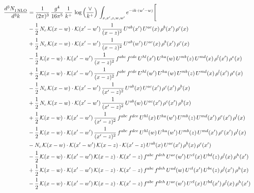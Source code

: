 \documentclass[9pt]{article}
\numberwithin{equation}{section}
\begin{document}
\begin{align}
\frac{d^{3}N_{1\,\rm NLO}^{\rm}}{d^{3}k}  & = \frac{1}{(2\pi)^{3}}\,\frac{g^{4}}{16\pi^{5}}\,\frac{1}{k^{+}}\,\log{\left(\frac{\vee}{k^{+}}\right)}\, \int_{x,x',z,w,w'}e^{-ik\cdot(w'-w)}\Bigg[\notag\\ &
-\frac{1}{2}\,N_{c}\,\mathcal{K}(x-w)\cdot\mathcal{K}(x'-w')\,\frac{1}{(x-z)^{2}}\,U^{ab}(x')\,U^{ac}(x)\,\rho^{b}(x')\,\rho^{c}(x)\notag\\
&+\frac{1}{2}\,N_{c}\,\mathcal{K}(x-w)\cdot\mathcal{K}(x'-w')\,\frac{1}{(x-z)^{2}}\,U^{ab}(w')\,U^{ac}(x)\,\rho^{b}(x')\,\rho^{c}(x)\notag\\
&-\frac{1}{2}\,\mathcal{K}(x-w)\cdot\mathcal{K}(x'-w')\,\frac{1}{(x-z)^{2}}\,f^{abc}\,f^{cde}\,U^{hl}(x')\,U^{ha}(w)\,U^{mb}(z)\,U^{md}(x)\,\rho^{l}(x')\,\rho^{e}(x)\notag\\
&+\frac{1}{2}\,\mathcal{K}(x-w)\cdot\mathcal{K}(x'-w')\,\frac{1}{(x-z)^{2}}\,f^{abc}\,f^{cde}\,U^{hl}(w')\,U^{ha}(w)\,U^{mb}(z)\,U^{md}(x)\,\rho^{l}(x')\,\rho^{e}(x)\notag\\
&-\frac{1}{2}\,N_{c}\,\mathcal{K}(x-w)\cdot\mathcal{K}(x'-w')\,\frac{1}{(x'-z)^{2}}\,U^{ab}(x)\,U^{ac}(x')\,\rho^{c}(x')\,\rho^{b}(x)\notag\\
&+\frac{1}{2}\,N_{c}\,\mathcal{K}(x-w)\cdot\mathcal{K}(x'-w')\,\frac{1}{(x'-z)^{2}}\,U^{ab}(w)\,U^{ac}(x')\,\rho^{c}(x')\,\rho^{b}(x)\notag\\
&+\frac{1}{2}\,\mathcal{K}(x-w)\cdot\mathcal{K}(x'-w')\,\frac{1}{(x'-z)^{2}}\,f^{abc}\,f^{dce}\,U^{hl}(x)\,U^{ha}(w')\,U^{mb}(z)\,U^{md}(x')\,\rho^{e}(x')\,\rho^{l}(x)\notag\\
&-\frac{1}{2}\,\mathcal{K}(x-w)\cdot\mathcal{K}(x'-w')\,\frac{1}{(x'-z)^{2}}\,f^{abc}\,f^{dce}\,U^{hl}(w)\,U^{ha}(w')\,U^{mb}(z)\,U^{md}(x')\,\rho^{e}(x')\,\rho^{l}(x)\notag\\
&-N_{c}\,\mathcal{K}(x-w)\cdot\mathcal{K}(x'-w')\,\mathcal{K}(x-z)\cdot\mathcal{K}(x'-z)\,U^{ab}(x)\,U^{ac}(x')\,\rho^{b}(x)\,\rho^{c}(x')\notag\\
&-\frac{1}{2}\,\mathcal{K}(x-w)\cdot\mathcal{K}(x'-w')\,\mathcal{K}(x-z)\cdot\mathcal{K}(x'-z)\,f^{abc}\,f^{deh}\,U^{ae}(w')\,U^{cl}(x)\,U^{bd}(z)\,\rho^{l}(x)\,\rho^{h}(x')\notag\\
&+\frac{1}{2}\,\mathcal{K}(x-w)\cdot\mathcal{K}(x'-w')\,\mathcal{K}(x-z)\cdot\mathcal{K}(x'-z)\,f^{abc}\,f^{deh}\,U^{ad}(w)\,U^{cl}(x')\,U^{be}(z)\,\rho^{l}(x')\,\rho^{h}(x)\notag\\
&-\frac{1}{2}\,\mathcal{K}(x-w)\cdot\mathcal{K}(x'-w')\,\mathcal{K}(x-z)\cdot\mathcal{K}(x'-z)\,f^{abc}\,f^{deh}\,U^{ae}(w')\,U^{cl}(x)\,U^{bd}(x')\,\rho^{l}(x)\,\rho^{h}(x')\notag\\

\end{align}
\end{document}
